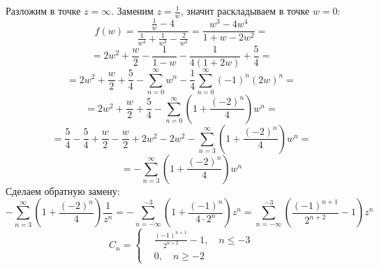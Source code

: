 \documentclass[14pt, a4paper, titlepage, fleqn]{extarticle}
\begin{document}
\begin{enumerate}

        Разложим в точке \( z = \infty \). Заменим \( z = \frac{1}{w} \), значит раскладываем в точке \( w = 0 \):
        \[
            f(w) = \frac{\frac{1}{w}-4}{\frac{1}{w^4} + \frac{1}{w^3}-\frac{2}{w^2}} = \frac{w^3-4w^4}{1+w-2w^2} = 
        \]
        \[
            = 2w^2 + \frac{w}{2} - \frac{1}{1-w} - \frac{1}{4(1+2w)} + \frac{5}{4} =
        \]
        \[
            = 2w^2 + \frac{w}{2} + \frac{5}{4} - \sum_{n=0}^{\infty} w^n - \frac{1}{4} \sum_{n=0}^{\infty} (-1)^n (2w)^n =
        \]
        \[
            = 2w^2 + \frac{w}{2} + \frac{5}{4} - \sum_{n=0}^{\infty} \left(1 + \frac{(-2)^n}{4} \right) w^n =
        \]
        \[
            = \frac{5}{4} - \frac{5}{4} + \frac{w}{2} - \frac{w}{2} + 2w^2 - 2w^2 - \sum_{n=3}^{\infty} \left(1 + \frac{(-2)^n}{4} \right) w^n =
        \]
        \[
            = - \sum_{n=3}^{\infty} \left(1 + \frac{(-2)^n}{4} \right) w^n 
        \]
        Сделаем обратную замену:
        \[
            - \sum_{n=3}^{\infty} \left(1 + \frac{(-2)^n}{4} \right) \frac{1}{z^n} = - \sum_{n=-\infty}^{-3} \left(1 + \frac{(-1)^n}{4 \cdot 2^n} \right) z^n = \sum_{n=-\infty}^{-3} \left(\frac{(-1)^{n+1}}{2^{n+2}} - 1 \right) z^n
        \]
        \[
            C_n = \left\lbrace
                \begin{aligned}
                    &\frac{(-1)^{n+1}}{2^{n+2}} - 1, \quad n \leq -3 \\
                    &0, \quad n \geq -2
                \end{aligned}
            \right.
        \]


\end{enumerate}
\end{document}
